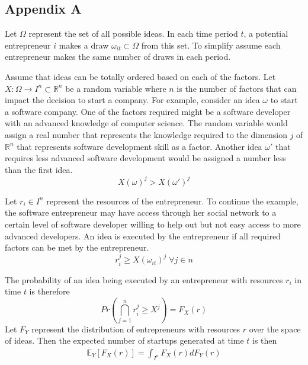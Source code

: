 \documentclass[12pt]{article}
\begin{document}
\subsection*{Appendix A}

Let $\Omega$ represent the set of all possible ideas. In each time period $t$, a potential entrepreneur $i$ makes a draw $\omega_{it} \subset \Omega$ from this set. To simplify assume each entrepreneur makes the same number of draws in each period. 

Assume that ideas can be totally ordered based on each of the factors. Let $X:\Omega\to I^n \subset \mathbb{R}^n$ be a random variable where $n$ is the number of factors that can impact the decision to start a company. For example, consider an idea $\omega$ to start a software company. One of the factors required might be a software developer with an advanced knowledge of computer science. The random variable would assign a real number that represents the knowledge required to the dimension $j$ of $\mathbb{R}^n$ that represents software development skill as a factor. Another idea $\omega'$ that requires less advanced software development would be assigned a number less than the first idea. 
$$X(\omega)^j > X(\omega')^j $$

Let $r_i \in I^n$ represent the resources of the entrepreneur. To continue the example, the software entrepreneur may have access through her social network to a certain level of software developer willing to help out but not easy access to more advanced developers. An idea is executed by the entrepreneur if all required factors can be met by the entrepreneur. 
$$r_i^j \ge X(\omega_{it})^j \; \forall j \in n$$

\begin{comment}
We call an idea \textit{unbounded} for an individual if the idea can be executed and \textit{single bounded} on dimension $k$ if
$$\alpha_i^k = X(\omega{it})^k \wedge  \alpha_i^j > X(\omega{it})^j \; \forall j \ne k \in n$$
\end{comment}

The probability of an idea being executed by an entrepreneur with resources $r_i$ in time $t$ is therefore 
$$Pr\left(\bigcap _{j=1}^n  r_i^j \ge X^j\right) = F_X(r)$$
Let $F_Y$ represent the distribution of entrepreneurs with resources $r$ over the space of ideas. Then the expected number of startups generated at time $t$ is then 
\begin{align}
\mathbb{E}_{Y}[F_X(r)]=\int_{I^n} F_X(r) dF_Y(r)
\end{align}
\end{document}
